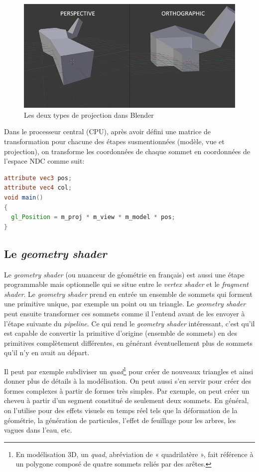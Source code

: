 \begin{figure}[h]
    \centering
    \includegraphics[width=0.75\linewidth]{images//shaders/syscoord5.png}
    \caption{Les deux types de projection dans Blender}
    \label{syscoord5}
\end{figure}


Dans le processeur central (CPU), après avoir défini une matrice de transformation pour chacune des étapes susmentionnées (modèle, vue et projection), on transforme les coordonnées de chaque sommet en coordonnées de l'espace NDC comme suit:

\begin{minipage}{\linewidth}
\begin{lstlisting}[language=GLSL, caption=\textit{Vertex shader} en GLSL]
attribute vec3 pos;
attribute vec4 col;
void main()
{
  gl_Position = m_proj * m_view * m_model * pos;
}
\end{lstlisting}
\end{minipage}

\subsection*{Le \textit{geometry shader}}

Le \textit{geometry shader} (ou nuanceur de géométrie en français) est aussi une étape programmable mais optionnelle qui se situe entre le \textit{vertex shader} et le \textit{fragment shader}. Le \textit{geometry shader} prend en entrée un ensemble de sommets qui forment une primitive unique, par exemple un point ou un triangle. Le \textit{geometry shader} peut ensuite transformer ces sommets comme il l'entend avant de les envoyer à l'étape suivante du \textit{pipeline}. Ce qui rend le \textit{geometry shader} intéressant, c'est qu'il est capable de convertir la primitive d'origine (ensemble de sommets) en des primitives complètement différentes, en générant éventuellement plus de sommets qu'il n'y en avait au départ.

Il peut par exemple subdiviser un \textit{quad}\footnote{En modélisation 3D, un \textit{quad}, abréviation de « quadrilatère », fait référence à un polygone composé de quatre sommets reliés par des arêtes.} pour créer de nouveaux triangles et ainsi donner plus de détails à la modélisation. On peut aussi s'en servir pour créer des formes complexes à partir de formes très simples. Par exemple, on peut créer un cheveu à partir d'un segment constitué de seulement deux sommets. En général, on l'utilise pour des effets visuels en temps réel tels que la déformation de la géométrie, la génération de particules, l'effet de feuillage pour les arbres, les vagues dans l'eau, etc.

